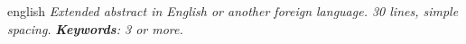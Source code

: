 \par
\begin{resumo}[Abstract]
\begin{otherlanguage*}{english}
\emph{
Extended abstract in English or another foreign language. 30 lines, simple spacing.
\lipsum[5]
}
\vspace{\onelineskip}
\noindent
\emph{	
\textbf{Keywords}: 3 or more.
}
\end{otherlanguage*}
\end{resumo}
